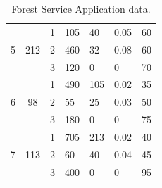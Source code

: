 \documentclass[a4paper,10 pt,titlepage,twoside]{book}
\theoremstyle{plain}
\theoremstyle{definition}
\theoremstyle{remark}
\begin{document}
{{\begin{table}[]
\begin{tabular}{cccllll}
		\multirow{3}{*}{5} & \multirow{3}{*}{212} & 1 & 105 & 40 & 0.05 & 60 \\
		&  & 2 & 460 & 32 & 0.08 & 60 \\
		&  & 3 & 120 & 0 & 0 & 70 \\ \hline
		\multirow{3}{*}{6} & \multirow{3}{*}{98} & 1 & 490 & 105 & 0.02 & 35 \\
		&  & 2 & 55 & 25 & 0.03 & 50 \\
		&  & 3 & 180 & 0 & 0 & 75 \\ \hline
		\multirow{3}{*}{7} & \multirow{3}{*}{113} & 1 & 705 & 213 & 0.02 & 40 \\
		&  & 2 & 60 & 40 & 0.04 & 45 \\
		&  & 3 & 400 & 0 & 0 & 95 \\ \hline
	\end{tabular}\caption{\label{table:timber}Forest Service Application data.}
\end{table}

}}
\end{document}
